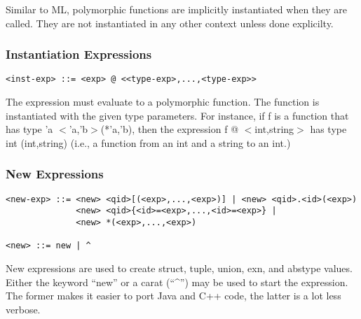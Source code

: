 \documentclass[titlepage,10pt]{article}
\begin{document}
Similar to ML, polymorphic functions are implicitly instantiated when
they are called.  They are not instantiated in any other context unless
done explicilty.

\subsubsection{Instantiation Expressions}


\begin{verbatim}
<inst-exp> ::= <exp> @ <<type-exp>,...,<type-exp>>
\end{verbatim}

The expression must evaluate to a polymorphic function.  The function is
instantiated with the given type parameters.  For instance, if f is a
function that has type 'a $<$'a,'b$>$(*'a,'b), then the expression f @
$<$int,string$>$ has type int (int,string) (i.e., a function from an int
and a string to an int.)

\subsubsection{New Expressions}


\begin{verbatim}
<new-exp> ::= <new> <qid>[(<exp>,...,<exp>)] | <new> <qid>.<id>(<exp>)
              <new> <qid>{<id>=<exp>,...,<id>=<exp>} |
              <new> *(<exp>,...,<exp>)

<new> ::= new | ^ 
\end{verbatim}


New expressions are used to create struct, tuple, union, exn, and
abstype values.  Either the keyword ``new'' or a carat (``\^{}'') may be
used to start the expression.  The former makes it easier to port Java
and C++ code, the latter is a lot less verbose.
\end{document}
